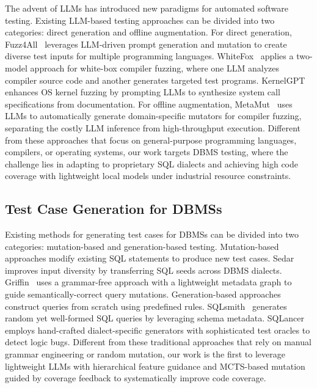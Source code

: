 The advent of LLMs has introduced new paradigms for automated software testing. Existing LLM-based testing approaches can be divided into two categories: direct generation and offline augmentation. For direct generation, Fuzz4All~\cite{fuzz4all} leverages LLM-driven prompt generation and mutation to create diverse test inputs for multiple programming languages. WhiteFox~\cite{YangDLY0J024} applies a two-model approach for white-box compiler fuzzing, where one LLM analyzes compiler source code and another generates targeted test programs. KernelGPT~\cite{YangZZ25} enhances OS kernel fuzzing by prompting LLMs to synthesize system call specifications from documentation. For offline augmentation, MetaMut~\cite{OuL0024} uses LLMs to automatically generate domain-specific mutators for compiler fuzzing, separating the costly LLM inference from high-throughput execution. Different from these approaches that focus on general-purpose programming languages, compilers, or operating systems, our work targets DBMS testing, where the challenge lies in adapting to proprietary SQL dialects and achieving high code coverage with lightweight local models under industrial resource constraints.

\subsection{Test Case Generation for DBMSs}

Existing methods for generating test cases for DBMSs can be divided into two categories: mutation-based and generation-based testing. Mutation-based approaches modify existing SQL statements to produce new test cases. Sedar~\cite{Fu0W024} improves input diversity by transferring SQL seeds across DBMS dialects. Griffin~\cite{FuLWWJ22} uses a grammar-free approach with a lightweight metadata graph to guide semantically-correct query mutations. Generation-based approaches construct queries from scratch using predefined rules. SQLsmith~\cite{SQLsmith} generates random yet well-formed SQL queries by leveraging schema metadata. SQLancer~\cite{SQLancer1,SQLancer2,SQLancer3} employs hand-crafted dialect-specific generators with sophisticated test oracles to detect logic bugs. Different from these traditional approaches that rely on manual grammar engineering or random mutation, our work is the first to leverage lightweight LLMs with hierarchical feature guidance and MCTS-based mutation guided by coverage feedback to systematically improve code coverage.